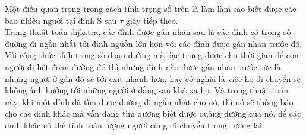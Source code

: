     Một điều quan trọng trong cách tính trọng số trên là làm làm sao biết được cáo bao 
    nhiêu người tại đỉnh S sau $\tau$ giây tiếp theo.  \\ 
    Trong thuật toán dijkstra, các đỉnh được gán nhãn sau là các đỉnh có trọng số đường đi 
    ngắn nhất tới đỉnh nguồn lớn hơn với các đỉnh được gán nhãn trước đó. Với công thức 
    tính trọng số đoạn đường mà đặc trưng được cho thời gian để con người đi hết đoạn đường
    đó thì những đỉnh nào được gán nhãn trước tức là những người ở gần đó sẽ tới exit 
    nhanh hơn, hay có nghĩa là việc họ di chuyển sẽ không ảnh hưởng tới những người 
    ở dằng sau khá xa họ. Và trong thuật toán này, khi một đỉnh đã tìm được đường đi 
    ngắn nhất cho nó, thì nó sẽ thông báo cho các đỉnh khác mà vẫn đang tìm đường biết
    được quãng đường của nó, để các đỉnh khác có thể tính toán lượng người cùng di chuyển 
    trong tương lai.
    \newpage
    
